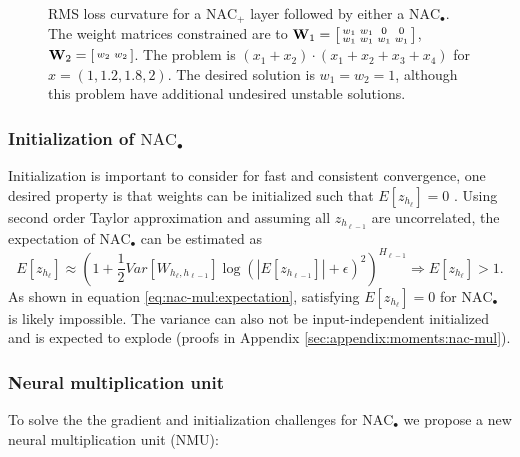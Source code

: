 \begin{figure}[h]
\caption{RMS loss curvature for a $\mathrm{NAC}_{+}$ layer followed by either a $\mathrm{NAC}_{\bullet}$. The weight matrices constrained are to $\mathbf{W}_1 = \left[\protect\begin{smallmatrix}
w_1 & w_1 & 0 & 0 \\
w_1 & w_1 & w_1 & w_1
\protect\end{smallmatrix}\right]$, $\mathbf{W}_2 = \left[\protect\begin{smallmatrix}
w_2 & w_2
\protect\end{smallmatrix}\right]$. The problem is $(x_1 + x_2) \cdot (x_1 + x_2 + x_3 + x_4)$ for $x = \left(1, 1.2, 1.8, 2\right)$. The desired solution is $w_1 = w_2 = 1$, although this problem have additional undesired unstable solutions.}
\label{fig:nac-mul-eps-issue}
\end{figure}

\subsubsection{Initialization of \texorpdfstring{$\mathrm{NAC}_{\bullet}$}{NAC-mul}}
Initialization is important to consider for fast and consistent convergence, one desired property is that weights can be initialized such that $E[z_{h_\ell}] = 0$ \cite{glorot-initialization}. Using second order Taylor approximation and assuming all $z_{h_{\ell-1}}$ are uncorrelated, the expectation of $\mathrm{NAC}_{\bullet}$ can be estimated as
\begin{equation}
E[z_{h_\ell}] \approx \left(1 + \frac{1}{2} Var[W_{h_\ell, h_{\ell-1}}] \log(|E[z_{h_{\ell-1}}]| + \epsilon)^2\right)^{H_{\ell-1}} \Rightarrow E[z_{h_\ell}] > 1.
\label{eq:nac-mul:expectation}
\end{equation}
As shown in equation \ref{eq:nac-mul:expectation}, satisfying $E[z_{h_\ell}] = 0$ for $\mathrm{NAC}_{\bullet}$ is likely impossible. The variance can also not be input-independent initialized and is expected to explode (proofs in Appendix \ref{sec:appendix:moments:nac-mul}).

\subsubsection{Neural multiplication unit}
To solve the the gradient and initialization challenges for $\mathrm{NAC}_{\bullet}$ we propose a new neural multiplication unit (NMU):

